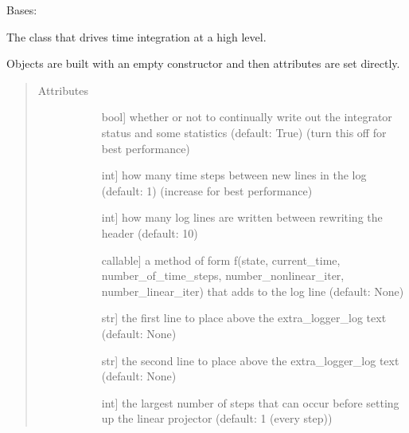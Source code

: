 \documentclass[letterpaper,10pt,english]{sphinxmanual}
\begin{document}

\begin{fulllineitems}
\label{\detokenize{spitfire.time.governor:spitfire.time.governor.Governor}}
Bases: 

The class that drives time integration at a high level.

Objects are built with an empty constructor and then attributes are set directly.
\begin{quote}\begin{description}
\item[{Attributes}] \leavevmode\begin{description}
\item[{}] \leavevmode{[}bool{]}
whether or not to continually write out the integrator status and some statistics (default: True)
(turn this off for best performance)

\item[{}] \leavevmode{[}int{]}
how many time steps between new lines in the log (default: 1) (increase for best performance)

\item[{}] \leavevmode{[}int{]}
how many log lines are written between rewriting the header (default: 10)

\item[{}] \leavevmode{[}callable{]}
a method of form f(state, current\_time, number\_of\_time\_steps, number\_nonlinear\_iter, number\_linear\_iter)
that adds to the log line (default: None)

\item[{}] \leavevmode{[}str{]}
the first line to place above the extra\_logger\_log text (default: None)

\item[{}] \leavevmode{[}str{]}
the second line to place above the extra\_logger\_log text (default: None)

\item[{}] \leavevmode{[}int{]}
the largest number of steps that can occur before setting up the linear projector (default: 1 (every step))


\end{description}
\end{description}
\end{quote}
\end{fulllineitems}
\end{document}
